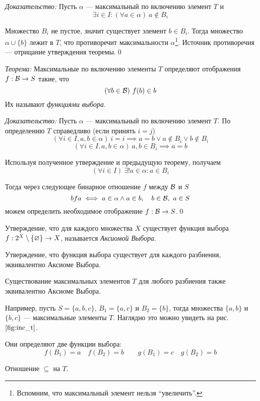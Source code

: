 {\it Доказательство:}
Пусть $\alpha$ --- максимальный по включению элемент $T$ и
\[
	\exists i\in I:(\forall a\in\alpha)~a\notin B_{i}
\]

Множество $B_{i}$ не пустое, значит существует элемент $b\in B_{i}$.
Тогда множество $\alpha\cup \{b\}$ лежит в $T$, что противоречит
максимальности $\alpha$\footnote{Вспомним, что максимальный элемент
нельзя ``увеличить''.}.
Источник противоречия --- отрицание утверждения теоремы.\qed

\vspace{1em}
{\it Теорема:} Максимальные по включению элементы $T$ определяют
отображения $f:\mathcal B\to S$ такие, что
\[
	(\forall b\in\mathcal B)~f(b)\in b
\]
Их называют {\it функциями выбора}.

{\it Доказательство:} Пусть $\alpha$ --- максимальный по включению
элемент $T$.
По определению $T$ справедливо (если принять $i=j$)
\[
	(\forall i\in I,a,b\in\alpha)~i=i\implies a=b\lor a\notin B_{i}\lor b\notin B_{i}
\]
\[
	(\forall i\in I,a,b\in\alpha)~a,b\in B_{i}\implies a=b
\]

Используя полученное утверждение и предыдущую теорему, получаем
\[
	(\forall i\in I)~\exists !a\in\alpha:a\in B_{i}
\]

Тогда через следующее бинарное отношение $f$ между $\mathcal B$ и $S$
\[
	bfa\iff a\in \alpha\land a\in b,\quad b\in\mathcal B,~a\in S
\]
можем определить необходимое отображение $f:\mathcal B\to S$.\qed

Утверждение, что для каждого множества $X$ существует функция
выбора $f:2^{X}\setminus\{\varnothing\}\to X$,
называется {\it Аксиомой Выбора}.

Утверждение, что функция выбора существует для каждого разбиения,
эквивалентно Аксиоме Выбора.

Существование максимальных элементов $T$ для любого
разбиения также эквивалентно Аксиоме Выбора.

Например, пусть $S=\{a,b,c\}$, $B_1=\{a,c\}$ и $B_2=\{b\}$, тогда
множества $\{a,b\}$ и $\{b,c\}$ --- максимальные элементы $T$.
Наглядно это можно увидеть на рис. $\ref{fig:inc_t}$.

Они определяют две функции выбора:
\[
	f(B_1)=a\quad f(B_2)=b\qquad g(B_1)=c\quad g(B_2)=b
\]

\begin{marginfigure}
	\center

	\caption{Отношение $\subseteq$ на $T$.}\label{fig:inc_t}
\end{marginfigure}

